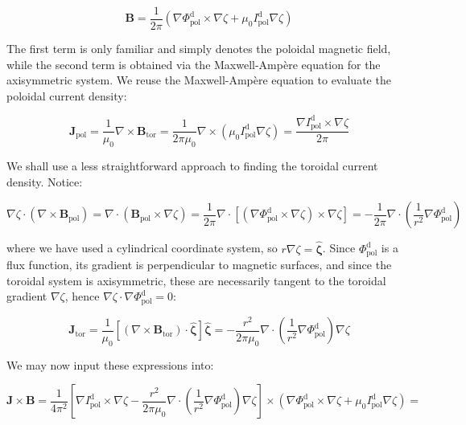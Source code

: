 \begin{equation}
    \mathbf{B}=\frac{1}{2\pi}\left(\nabla\Phi_\text{pol}^\mathrm{d}\times\nabla\zeta+\mu_0I_\text{pol}^\mathrm{d}\nabla\zeta\right)
\end{equation}

The first term is only familiar and simply denotes the poloidal magnetic field, while the second term is obtained via the Maxwell-Ampère equation for the axisymmetric system. We reuse the Maxwell-Ampère equation to evaluate the poloidal current density:

\begin{equation}
    \mathbf{J}_\text{pol}=\frac{1}{\mu_0}\nabla\times\mathbf{B}_\text{tor}=\frac{1}{2\pi\mu_0}\nabla\times\left(\mu_0I_\text{pol}^\mathrm{d}\nabla\zeta\right)=\frac{\nabla I_\text{pol}^\mathrm{d}\times\nabla\zeta}{2\pi}
\end{equation}

We shall use a less straightforward approach to finding the toroidal current density. Notice:

\begin{equation}
    \nabla\zeta\cdot(\nabla\times\mathbf{B}_\text{pol})=\nabla\cdot\left(\mathbf{B}_\text{pol}\times\nabla\zeta\right)=\frac{1}{2\pi}\nabla\cdot\left[\left(\nabla\Phi_\text{pol}^\mathrm{d}\times\nabla\zeta\right)\times\nabla\zeta\right]=-\frac{1}{2\pi}\nabla\cdot\left(\frac{1}{r^2}\nabla\Phi_\text{pol}^\mathrm{d}\right)
\end{equation}

where we have used a cylindrical coordinate system, so $r\nabla\zeta=\boldsymbol{\hat{\zeta}}$. Since $\Phi_\text{pol}^\mathrm{d}$ is a flux function, its gradient is perpendicular to magnetic surfaces, and since the toroidal system is axisymmetric, these are necessarily tangent to the toroidal gradient $\nabla\zeta$, hence $\nabla\zeta\cdot\nabla\Phi_\text{pol}^\mathrm{d}=0$:

\begin{equation}
    \label{eq-6-54}
    \mathbf{J}_\text{tor}=\frac{1}{\mu_0}\left[(\nabla\times\mathbf{B}_\text{tor})\cdot\boldsymbol{\hat{\zeta}}\right]\boldsymbol{\hat{\zeta}}=-\frac{r^2}{2\pi\mu_0}\nabla\cdot\left(\frac{1}{r^2}\nabla\Phi_\text{pol}^\mathrm{d}\right)\nabla\zeta
\end{equation}

We may now input these expressions into:

\begin{equation}
    \mathbf{J}\times\mathbf{B}=\frac{1}{4\pi^2}\left[\nabla I_\text{pol}^\mathrm{d}\times\nabla\zeta-\frac{r^2}{2\pi\mu_0}\nabla\cdot\left(\frac{1}{r^2}\nabla\Phi_\text{pol}^\mathrm{d}\right)\nabla\zeta\right]\times\left(\nabla\Phi_\text{pol}^\mathrm{d}\times\nabla\zeta+\mu_0I_\text{pol}^\mathrm{d}\nabla\zeta\right)=
\end{equation}

